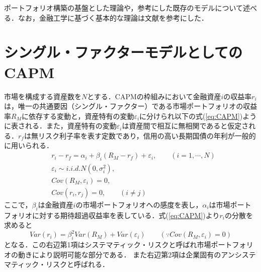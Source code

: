 ﻿\documentclass[11pt]{jreport}
\begin{document}
ポートフォリオ構築の基盤とした理論や，参考にした既存のモデルについて述べる．なお，金融工学に基づく基本的な理論は文献\cite{analyst}\cite{finance}を参考にした．


\section{シングル・ファクターモデルとしてのCAPM}
市場を構成する資産数を$N$とする．CAPMの枠組みにおいて金融資産$i$の収益率$r_i$は，唯一の共通要因（シングル・ファクター）である市場ポートフォリオの収益率$R_M$に依存する変動と，資産特有の変動$\varepsilon_i$に分けられ以下の式(\ref{eq:CAPM})ように表される．また，資産特有の変動$\varepsilon_i$は資産間で相互に無相関であると仮定される．$r_f$は無リスク利子率を表す定数であり，信用の高い長期国債の年利が一般的に用いられる．
\begin{equation}
\begin{split}
&r_i - r_f = \alpha_i + \beta_i(R_M - r_f) + \varepsilon_i,\qquad(i=1,\cdots,N)\\
&\varepsilon_i \sim i.i.d.N(0,\sigma_i^2),\\
&Cov(R_M, \varepsilon_i) = 0,\\
&Cov(r_i, r_j) = 0, \qquad (i \neq j)
\label{eq:CAPM}
\end{split}
\end{equation}
ここで，$\beta_i$は金融資産$i$の市場ポートフォリオへの感度を表し，$\alpha_i$は市場ポートフォリオに対する期待超過収益率を表している．式(\ref{eq:CAPM})より$r_i$の分散を求めると
\begin{equation}
Var(r_i) = \beta_i^2Var(R_M) + Var(\varepsilon_i) \qquad (\text{∵}Cov(R_M, \varepsilon_i) = 0)
\label{eq:CAPM_var}
\end{equation}
となる．この右辺第1項はシステマティック・リスクと呼ばれ市場ポートフォリオの動きにより説明可能な部分である．
また右辺第2項は企業固有のアンシステマティック・リスクと呼ばれる．
\end{document}
